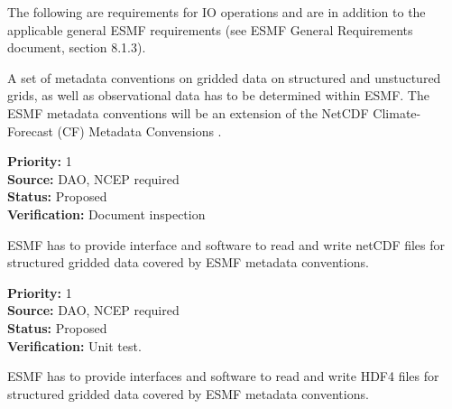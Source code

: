 

The following are requirements for IO operations and are in addition
to the applicable general ESMF requirements (see ESMF General 
Requirements document, section 8.1.3).



A set of metadata conventions on gridded data on structured and
unstuctured grids, as well as observational data has to be determined
within ESMF. The ESMF metadata conventions will be an extension of the NetCDF 
Climate-Forecast (CF) Metadata Convensions \cite{NetCDF_CF_v1_beta3}.


\begin{reqlist}
{\bf Priority:} 1 \\
{\bf Source:} DAO, NCEP required \\
{\bf Status:} Proposed \\
{\bf Verification:} Document inspection \\
\end{reqlist}





ESMF has to provide interface and software to read and write netCDF
files for structured gridded data covered by ESMF metadata conventions. 

\begin{reqlist}
{\bf Priority:} 1 \\
{\bf Source:} DAO, NCEP required \\
{\bf Status:} Proposed \\
{\bf Verification:} Unit test. \\
\end{reqlist}


ESMF has to provide interfaces and software to read and write HDF4
files for structured gridded data covered by ESMF metadata conventions. 

